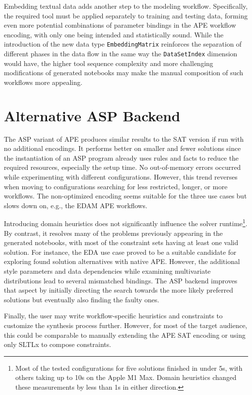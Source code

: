 Embedding textual data adds another step to the modeling workflow. Specifically, the required tool must be applied separately to training and testing data, forming even more potential combinations of parameter bindings in the APE workflow encoding, with only one being intended and statistically sound. While the introduction of the new data type \verb|EmbeddingMatrix| reinforces the separation of different phases in the data flow in the same way the \verb|DataSetIndex| dimension would have, the higher tool sequence complexity and more challenging modifications of generated notebooks may make the manual composition of such workflows more appealing.


\section{Alternative ASP Backend}
The ASP variant of APE produces similar results to the SAT version if run with no additional encodings. It performs better on smaller and fewer solutions since the instantiation of an ASP program already uses rules and facts to reduce the required resources, especially the setup time. No out-of-memory errors occurred while experimenting with different configurations. However, this trend reverses when moving to configurations searching for less restricted, longer, or more workflows. The non-optimized encoding seems suitable for the three use cases but slows down on, e.g., the EDAM APE workflows.

Introducing domain heuristics does not significantly influence the solver runtime\footnote{Most of the tested configurations for five solutions finished in under 5s, with others taking up to 10s on the Apple M1 Max. Domain heuristics changed these measurements by less than 1s in either direction.}. By contrast, it resolves many of the problems previously appearing in the generated notebooks, with most of the constraint sets having at least one valid solution. For instance, the EDA use case proved to be a suitable candidate for exploring found solution alternatives with native APE. However, the additional style parameters and data dependencies while examining multivariate distributions lead to several mismatched bindings. The ASP backend improves that aspect by initially directing the search towards the more likely preferred solutions but eventually also finding the faulty ones.

Finally, the user may write workflow-specific heuristics and constraints to customize the synthesis process further. However, for most of the target audience, this could be comparable to manually extending the APE SAT encoding or using only SLTLx to compose constraints.

